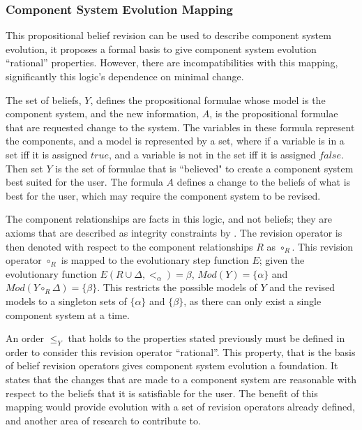 \subsubsection{Component System Evolution Mapping}
This propositional belief revision can be used to describe component system evolution, it proposes a formal basis to give component system evolution ``rational'' properties.
However, there are incompatibilities with this mapping, significantly this logic's dependence on minimal change.

The set of beliefs, $Y$, defines the propositional formulae whose model is the component system,
and the new information, $A$, is the propositional formulae that are requested change to the system.
The variables in these formula represent the components, and a model is represented by a set, where if a variable is in a set iff it is assigned $true$, 
and a variable is not in the set iff it is assigned $false$. 
Then set $Y$ is the set of formulae that is ``believed" to create a component system best suited for the user.
The formula $A$ defines a change to the beliefs of what is best for the user, which may require the component system to be revised.

The component relationships are facts in this logic, and not beliefs; they are axioms that are described as integrity constraints by \citep{katsuno1991propositional}.
The revision operator is then denoted with respect to the component relationships $R$ as $\circ_R$.
This revision operator $\circ_R$ is mapped to the evolutionary step function $E$;
given the evolutionary function $E(R \cup \Delta,<_{\alpha}) = \beta$, $Mod(Y) = \{\alpha\}$ and $Mod(Y \circ_{R} \Delta) = \{\beta\}$.
This restricts the possible models of $Y$ and the revised models to a singleton sets of $\{\alpha\}$ and $\{\beta\}$,
as there can only exist a single component system at a time.

An order $\leq_{Y}$ that holds to the properties stated previously must be defined in order to consider this revision operator ``rational''.
This property, that is the basis of belief revision operators gives component system evolution a foundation.
It states that the changes that are made to a component system are reasonable with respect to the beliefs that it is satisfiable for the user.
The benefit of this mapping would provide evolution with a set of revision operators already defined, and another area of research to contribute to.

